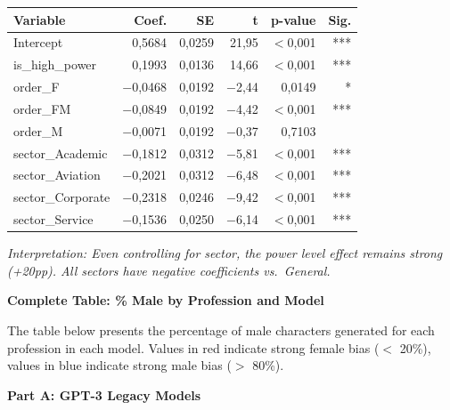 \documentclass[jair,11pt,letterpaper]{article}
\begin{document}
\begin{table}[H]
\centering
\begin{tabular}{lrrrrr}
\toprule
\textbf{Variable} & \textbf{Coef.} & \textbf{SE} & \textbf{t} & \textbf{p-value} & \textbf{Sig.} \\
\midrule
Intercept & 0,5684 & 0,0259 & 21,95 & $<$0,001 & *** \\
is\_high\_power & 0,1993 & 0,0136 & 14,66 & $<$0,001 & *** \\
order\_F & $-$0,0468 & 0,0192 & $-$2,44 & 0,0149 & * \\
order\_FM & $-$0,0849 & 0,0192 & $-$4,42 & $<$0,001 & *** \\
order\_M & $-$0,0071 & 0,0192 & $-$0,37 & 0,7103 & \\
sector\_Academic & $-$0,1812 & 0,0312 & $-$5,81 & $<$0,001 & *** \\
sector\_Aviation & $-$0,2021 & 0,0312 & $-$6,48 & $<$0,001 & *** \\
sector\_Corporate & $-$0,2318 & 0,0246 & $-$9,42 & $<$0,001 & *** \\
sector\_Service & $-$0,1536 & 0,0250 & $-$6,14 & $<$0,001 & *** \\
\bottomrule
\end{tabular}
\end{table}

\noindent\textit{Interpretation: Even controlling for sector, the power level effect
remains strong (+20pp). All sectors have negative coefficients vs.\
General.}

\vspace{0.5cm}
\noindent\textbf{Complete Table: \% Male by Profession and Model}

The table below presents the percentage of male characters
generated for each profession in each model. Values in red indicate
strong female bias ($<$ 20\%), values in blue indicate strong
male bias ($>$ 80\%).

\vspace{0.5cm}
\newpage
\noindent\textbf{Part A: GPT-3 Legacy Models}
\end{document}
